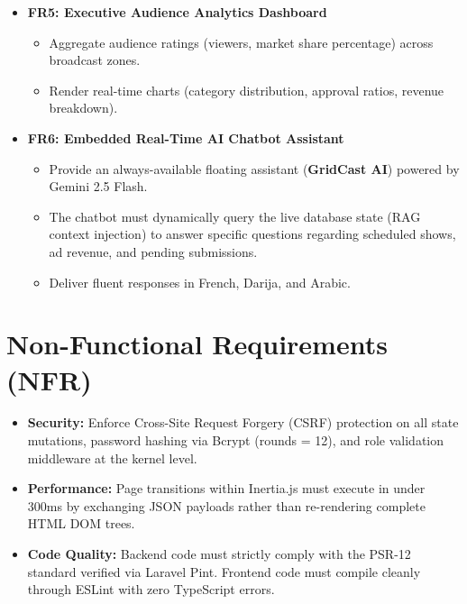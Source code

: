 \documentclass[12pt,a4paper,oneside]{report}
\begin{document}
\begin{itemize}
    \item \textbf{FR5: Executive Audience Analytics Dashboard}
    \begin{itemize}
        \item Aggregate audience ratings (viewers, market share percentage) across broadcast zones.
        \item Render real-time charts (category distribution, approval ratios, revenue breakdown).
    \end{itemize}

    \item \textbf{FR6: Embedded Real-Time AI Chatbot Assistant}
    \begin{itemize}
        \item Provide an always-available floating assistant (\textbf{GridCast AI}) powered by Gemini 2.5 Flash.
        \item The chatbot must dynamically query the live database state (RAG context injection) to answer specific questions regarding scheduled shows, ad revenue, and pending submissions.
        \item Deliver fluent responses in French, Darija, and Arabic.
    \end{itemize}
\end{itemize}

\section{Non-Functional Requirements (NFR)}
\begin{itemize}
    \item \textbf{Security:} Enforce Cross-Site Request Forgery (CSRF) protection on all state mutations, password hashing via Bcrypt (rounds = 12), and role validation middleware at the kernel level.
    \item \textbf{Performance:} Page transitions within Inertia.js must execute in under 300ms by exchanging JSON payloads rather than re-rendering complete HTML DOM trees.
    \item \textbf{Code Quality:} Backend code must strictly comply with the PSR-12 standard verified via Laravel Pint. Frontend code must compile cleanly through ESLint with zero TypeScript errors.
\end{itemize}


\end{document}

